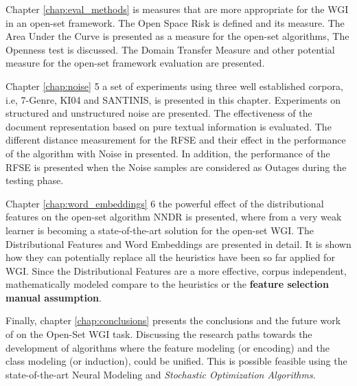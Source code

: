 Chapter \ref{chap:eval_methods} is measures that are more appropriate for the WGI in an open-set framework. The Open Space Risk is defined and its measure. The Area Under the Curve is presented as a measure for the open-set algorithms, The Openness test is discussed. The Domain Transfer Measure and other potential measure for the open-set framework evaluation are presented. 

Chapter \ref{chap:noise} 5 a set of experiments using three well established corpora, i.e, 7-Genre, KI04 and SANTINIS, is presented in this chapter. Experiments on structured and unstructured noise are presented. The effectiveness of the document representation based on pure textual information is evaluated. The different distance measurement for the RFSE and their effect in the performance of the algorithm with Noise in presented. In addition, the performance of the RFSE  is presented when the Noise samples are considered as Outages during the testing phase.

Chapter \ref{chap:word_embeddings} 6 the powerful effect of the distributional features on the open-set algorithm NNDR is presented, where from a very weak learner is becoming a state-of-the-art solution for the open-set WGI. The Distributional Features and Word Embeddings are presented in detail. It is shown how they can potentially replace all the heuristics have been so far applied for WGI. Since the Distributional Features are a more effective, corpus independent, mathematically modeled compare to the heuristics or the \textbf{feature selection manual assumption}. 

Finally, chapter \ref{chap:conclusions} presents the conclusions and the future work of on the Open-Set WGI task. Discussing the research paths towards the development of algorithms where the feature modeling (or encoding) and the class modeling (or induction), could be unified. This is possible feasible using the state-of-the-art Neural Modeling and \textit{Stochastic Optimization Algorithms}.

